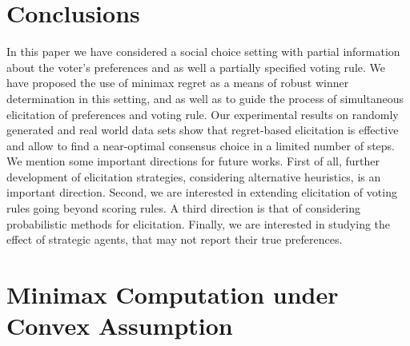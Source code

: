 \documentclass[12pt]{article}
\begin{document}
\section{Conclusions}  \label{sec:conclusions}

In this paper we have considered a  social choice setting with partial  information about the voter's  
preferences and as well a partially specified voting rule.
We have proposed the use of minimax regret as a means of robust winner determination in this setting, and as well as to guide the process of simultaneous elicitation of preferences and voting rule.
Our experimental results on randomly generated and real world data sets show that regret-based elicitation is effective and allow to find a near-optimal consensus choice in a limited number of steps.
We mention some  important directions for future works.
First of all, further development of elicitation strategies, considering alternative heuristics, is an important direction. 
Second, we are interested in extending elicitation of voting rules going beyond scoring rules.
A third direction is that of considering probabilistic methods for elicitation.
Finally, we are interested in studying the effect of strategic agents, that may not report their true preferences.



% 

\pagebreak
\ifappendix
\appendix
\section{Minimax Computation under Convex Assumption} 
\end{document}
